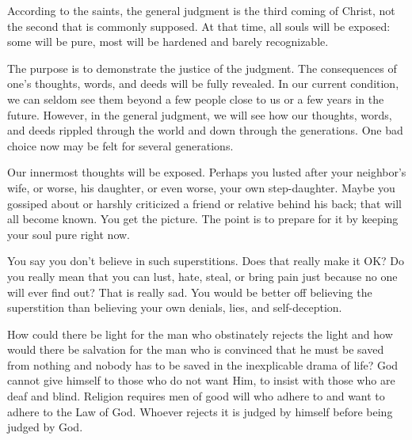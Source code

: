 According to the saints, the general judgment is the third coming of Christ, not the second that is commonly supposed. At that time, all souls will be exposed: some will be pure, most will be hardened and barely recognizable.

The purpose is to demonstrate the justice of the judgment. The consequences of one's thoughts, words, and deeds will be fully revealed. In our current condition, we can seldom see them beyond a few people close to us or a few years in the future. However, in the general judgment, we will see how our thoughts, words, and deeds rippled through the world and down through the generations. One bad choice now may be felt for several generations.

Our innermost thoughts will be exposed. Perhaps you lusted after your neighbor's wife, or worse, his daughter, or even worse, your own step-daughter. Maybe you gossiped about or harshly criticized a friend or relative behind his back; that will all become known. You get the picture. The point is to prepare for it by keeping your soul pure right now.

You say you don't believe in such superstitions. Does that really make it OK? Do you really mean that you can lust, hate, steal, or bring pain just because no one will ever find out? That is really sad. You would be better off believing the superstition than believing your own denials, lies, and self-deception.

\begin{quotex}
How could there be light for the man who obstinately rejects the light and how would there be salvation for the man who is convinced that he must be saved from nothing and nobody has to be saved in the inexplicable drama of life? God cannot give himself to those who do not want Him, to insist with those who are deaf and blind. Religion requires men of good will who adhere to and want to adhere to the Law of God. Whoever rejects it is judged by himself before being judged by God.
\end{quotex}





